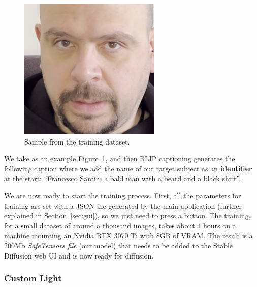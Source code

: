 \documentclass[preprint]{elsarticle}
\begin{document}
\begin{figure}[t]
	\centering
	\includegraphics[scale=0.3, keepaspectratio]{img/project_img/santini-training.png}
	\caption{Sample from the training dataset.}
	\label{fig:santini-training}
\end{figure}


We take as an example Figure~\ref{fig:santini-training}, and then BLIP captioning generates the following caption where we add the name of our target subject as an \textbf{identifier} at the start: ``Francesco Santini a bald man with a beard and a black shirt''.

We are now ready to start the training process.  First, all the parameters for training are set with a JSON file generated by the main application (further explained in Section~\ref{sec:gui}), so we just need to press a button. The training, for a small dataset of around a thousand images, 
takes about $4$ hours on a machine mounting an Nvidia RTX 3070 Ti with $8$GB of VRAM.  The result is a $200$Mb \emph{SafeTensors file} (our model) that needs to be added to the Stable Diffusion web UI and is now ready for diffusion.

\subsubsection{Custom Light}
\end{document}
